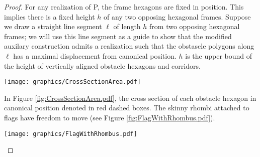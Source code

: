 \begin{proof}
For any realization of P, the frame hexagons are fixed in position.  
This implies there is a fixed height $h$ of any two opposing hexagonal frames.
Suppose we draw a straight line segment $\ell$ of length $h$ from two opposing hexagonal frames; we will use this line segment as a guide to show that the modified auxilary construction admits a realization such that the obstascle polygons along $\ell$ has a maximal displacement from canonical position.
$h$ is the upper bound of the height of vertically aligned obstacle hexagons and corridors.

\begin{minipage}{\linewidth}
\begin{center}
\texttt{[image: graphics/CrossSectionArea.pdf]}
\label{fig:CrossSectionArea.pdf}
\end{center}
\end{minipage}

In Figure \ref{fig:CrossSectionArea.pdf}, the cross section of each obstacle hexagon in canonical position denoted in red dashed boxes.
The skinny rhombi attached to flags have freedom to move (see Figure \ref{fig:FlagWithRhombus.pdf}).

\begin{minipage}{\linewidth}
\begin{center}
\texttt{[image: graphics/FlagWithRhombus.pdf]}
\label{fig:FlagWithRhombus.pdf}
\end{center}
\end{minipage}


\end{proof}
